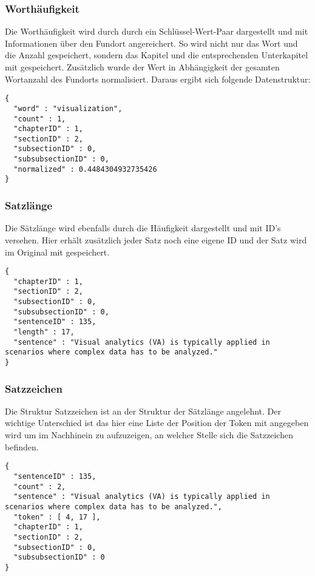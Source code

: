 \subsubsection*{Worthäufigkeit}
Die Worthäufigkeit wird durch durch ein Schlüssel-Wert-Paar dargestellt und mit Informationen über den Fundort angereichert. So wird nicht nur das Wort und die Anzahl gespeichert, sondern das Kapitel und die entsprechenden Unterkapitel mit gespeichert. Zusätzlich wurde der Wert in Abhängigkeit der gesamten Wortanzahl des Fundorts normalisiert. Daraus ergibt sich folgende Datenstruktur:

\begin{lstlisting}
{
  "word" : "visualization",
  "count" : 1,
  "chapterID" : 1,
  "sectionID" : 2,
  "subsectionID" : 0,
  "subsubsectionID" : 0,
  "normalized" : 0.4484304932735426
}
\end{lstlisting}

\subsubsection*{Satzlänge}
Die Sätzlänge wird ebenfalls durch die Häufigkeit dargestellt und mit ID's versehen. Hier erhält zusätzlich jeder Satz noch eine eigene ID und der Satz wird im Original mit gespeichert.

\begin{lstlisting}
{
  "chapterID" : 1,
  "sectionID" : 2,
  "subsectionID" : 0,
  "subsubsectionID" : 0,
  "sentenceID" : 135,
  "length" : 17,
  "sentence" : "Visual analytics (VA) is typically applied in scenarios where complex data has to be analyzed."
}
\end{lstlisting}

\subsubsection*{Satzzeichen}
Die Struktur Satzzeichen ist an der Struktur der Sätzlänge angelehnt. Der wichtige Unterschied ist das hier eine Liste der Position der Token mit angegeben wird um im Nachhinein zu aufzuzeigen, an welcher Stelle sich die Satzzeichen befinden.

\begin{lstlisting}
{
  "sentenceID" : 135,
  "count" : 2,
  "sentence" : "Visual analytics (VA) is typically applied in scenarios where complex data has to be analyzed.",
  "token" : [ 4, 17 ],
  "chapterID" : 1,
  "sectionID" : 2,
  "subsectionID" : 0,
  "subsubsectionID" : 0
}
\end{lstlisting}

